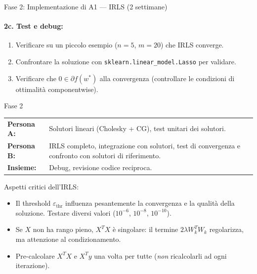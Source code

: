 \documentclass[a4paper,11pt]{article}
\begin{document}
\begin{phasebox}{Fase 2: Implementazione di A1 --- IRLS (2 settimane)}
\paragraph{2c. Test e debug:}
\begin{enumerate}[nosep]
  \item Verificare su un piccolo esempio ($n=5$, $m=20$) che IRLS converge.
  \item Confrontare la soluzione con \texttt{sklearn.linear\_model.Lasso} per validare.
  \item Verificare che $0 \in \partial f(w^*)$ alla convergenza (controllare le condizioni di ottimalità componentwise).
\end{enumerate}

\begin{splitbox}{Fase 2}
\begin{tabularx}{\textwidth}{lX}
\textbf{Persona A:} & Solutori lineari (Cholesky + CG), test unitari dei solutori. \\
\textbf{Persona B:} & IRLS completo, integrazione con solutori, test di convergenza e confronto con solutori di riferimento. \\
\textbf{Insieme:} & Debug, revisione codice reciproca.
\end{tabularx}
\end{splitbox}

\begin{warnbox}
Aspetti critici dell'IRLS:
\begin{itemize}[nosep]
  \item Il threshold $\varepsilon_{\text{thr}}$ influenza pesantemente la convergenza e la qualità della soluzione. Testare diversi valori ($10^{-6}$, $10^{-8}$, $10^{-10}$).
  \item Se $X$ non ha rango pieno, $X^TX$ è singolare: il termine $2\lambda W_k^TW_k$ regolarizza, ma attenzione al condizionamento.
  \item Pre-calcolare $X^TX$ e $X^Ty$ una volta per tutte (\emph{non} ricalcolarli ad ogni iterazione).
\end{itemize}
\end{warnbox}
\end{phasebox}
\end{document}
